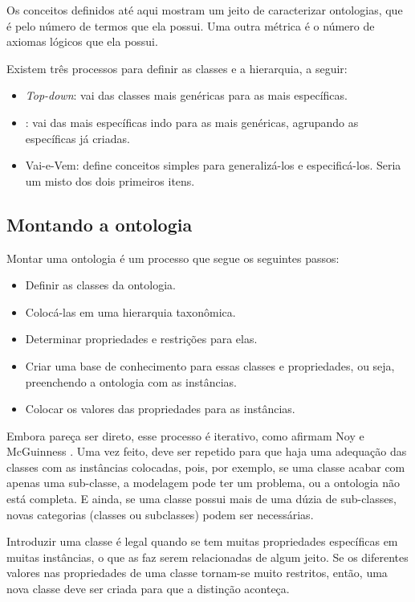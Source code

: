 Os conceitos definidos até aqui mostram um jeito de caracterizar ontologias, que é pelo número de termos que ela possui. Uma outra métrica é o número de axiomas lógicos que ela possui. 

Existem três processos para definir as classes e a hierarquia, a seguir:

\begin{itemize}
	\item \textit{Top-down}: vai das classes mais genéricas para as mais específicas.
	\item {}: vai das mais específicas indo para as mais genéricas, agrupando as específicas já criadas. 
	\item Vai-e-Vem: define conceitos simples para generalizá-los e especificá-los. Seria um misto dos dois primeiros itens.
\end{itemize}

\subsection{Montando a ontologia}

Montar uma ontologia é um processo que segue os seguintes passos:

\begin{itemize}
	\item Definir as classes da ontologia.
	\item Colocá-las em uma hierarquia taxonômica.
	\item Determinar propriedades e restrições para elas.
	\item Criar uma base de conhecimento para essas classes e propriedades, ou seja, preenchendo a ontologia com as instâncias.
	\item Colocar os valores das propriedades para as instâncias.
\end{itemize}

Embora pareça ser direto, esse processo é iterativo, como afirmam Noy e McGuinness \cite{ontoNoy}. Uma vez feito, deve ser repetido para que haja uma adequação das classes com as instâncias colocadas, pois, por exemplo, se uma classe acabar com apenas uma sub-classe, a modelagem pode ter um problema, ou a ontologia não está completa. E ainda, se uma classe possui mais de uma dúzia de sub-classes, novas categorias (classes ou subclasses) podem ser necessárias. 

Introduzir uma classe é legal quando se tem muitas propriedades específicas em muitas instâncias, o que as faz serem relacionadas de algum jeito. Se os diferentes valores nas propriedades de uma classe tornam-se muito restritos, então, uma nova classe deve ser criada para que a distinção aconteça.

